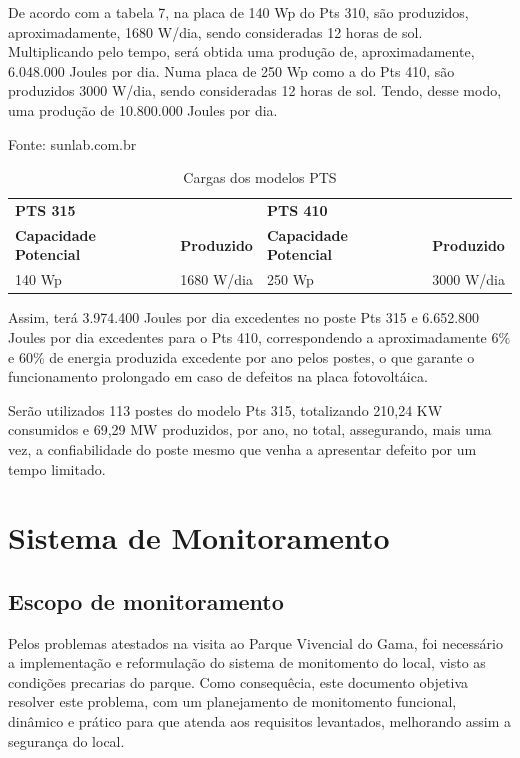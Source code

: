 	De acordo com a tabela 7, na placa de 140 Wp do Pts 310, são produzidos, aproximadamente, 1680 W/dia, sendo consideradas 12 horas de sol. Multiplicando pelo tempo, será obtida uma produção de, aproximadamente,  6.048.000 Joules por dia.
	Numa placa de 250 Wp como a do Pts 410, são produzidos 3000 W/dia, sendo consideradas 12 horas de sol. Tendo, desse modo, uma produção de 10.800.000 Joules por dia.
	
\begin{table}[h]
\center
\caption{Cargas dos modelos PTS}
\small{Fonte: sunlab.com.br}
\begin{tabular}{llll}
 &  &  &  \\ \hline
\multicolumn{2}{|l|}{\textbf{PTS 315}} & \multicolumn{2}{l|}{\textbf{PTS 410}} \\ \hline
\multicolumn{1}{|l|}{\textbf{Capacidade Potencial}} & \multicolumn{1}{l|}{\textbf{Produzido}} & \multicolumn{1}{l|}{\textbf{Capacidade Potencial}} & \multicolumn{1}{l|}{\textbf{Produzido}} \\ \hline
\multicolumn{1}{|l|}{140 Wp} & \multicolumn{1}{l|}{1680 W/dia} & \multicolumn{1}{l|}{250 Wp} & \multicolumn{1}{l|}{3000 W/dia} \\ \hline
\end{tabular}
\end{table}

	Assim, terá 3.974.400 Joules por dia excedentes no poste Pts 315 e 6.652.800 Joules por dia excedentes para o Pts 410, correspondendo a aproximadamente 6\% e 60\% de energia produzida excedente por ano pelos postes, o que garante o funcionamento prolongado em caso de defeitos na placa fotovoltáica.

	Serão utilizados 113 postes do modelo Pts 315, totalizando 210,24 KW consumidos e 69,29 MW produzidos, por ano, no total, assegurando, mais uma vez, a confiabilidade do poste mesmo que venha a apresentar defeito por um tempo limitado.

\section{Sistema de Monitoramento}

\subsection{Escopo de monitoramento}
	Pelos problemas atestados na visita ao Parque Vivencial do Gama, foi necessário a implementação e reformulação do sistema de monitomento do local, visto as condições precarias do parque. Como consequêcia, este documento objetiva resolver este problema, com um planejamento de monitomento funcional, dinâmico e prático para que atenda aos requisitos levantados,  melhorando assim a segurança do local.
	
